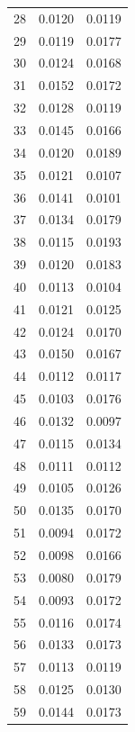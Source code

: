 \begin{longtable}{rcc}
28 & 0.0120 & 0.0119 \\
29 & 0.0119 & 0.0177 \\
30 & 0.0124 & 0.0168 \\
31 & 0.0152 & 0.0172 \\
32 & 0.0128 & 0.0119 \\
33 & 0.0145 & 0.0166 \\
34 & 0.0120 & 0.0189 \\
35 & 0.0121 & 0.0107 \\
36 & 0.0141 & 0.0101 \\
37 & 0.0134 & 0.0179 \\
38 & 0.0115 & 0.0193 \\
39 & 0.0120 & 0.0183 \\
40 & 0.0113 & 0.0104 \\
41 & 0.0121 & 0.0125 \\
42 & 0.0124 & 0.0170 \\
43 & 0.0150 & 0.0167 \\
44 & 0.0112 & 0.0117 \\
45 & 0.0103 & 0.0176 \\
46 & 0.0132 & 0.0097 \\
47 & 0.0115 & 0.0134 \\
48 & 0.0111 & 0.0112 \\
49 & 0.0105 & 0.0126 \\
50 & 0.0135 & 0.0170 \\
51 & 0.0094 & 0.0172 \\
52 & 0.0098 & 0.0166 \\
53 & 0.0080 & 0.0179 \\
54 & 0.0093 & 0.0172 \\
55 & 0.0116 & 0.0174 \\
56 & 0.0133 & 0.0173 \\
57 & 0.0113 & 0.0119 \\
58 & 0.0125 & 0.0130 \\
59 & 0.0144 & 0.0173 \\
\end{longtable}

